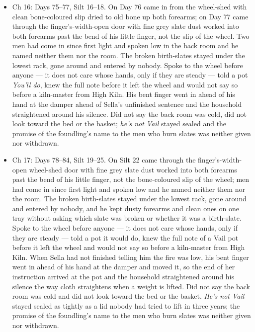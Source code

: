 \documentclass{design/chronicle}
\begin{document}
{\begin{itemize}[leftmargin=1.4em,itemsep=1pt,topsep=3pt,parsep=0pt]
\end{itemize}

\begin{itemize}[leftmargin=1.4em,itemsep=1pt,topsep=3pt,parsep=0pt]

\item Ch 16: Days 75–77, Silt 16–18. On Day 76 came in from the wheel-shed with clean bone-coloured slip dried to old bone up both forearms; on Day 77 came through the finger’s-width-open door with fine grey slate dust worked into both forearms past the bend of his little finger, not the slip of the wheel. Two men had come in since first light and spoken low in the back room and he named neither them nor the room. The broken birth-slates stayed under the lowest rack, gone around and entered by nobody. Spoke to the wheel before anyone --- it does not care whose hands, only if they are steady --- told a pot \emph{You’ll do}, knew the full note before it left the wheel and would not say so before a kiln-master from High Kiln. His bent finger went in ahead of his hand at the damper ahead of Sella’s unfinished sentence and the household straightened around his silence. Did not say the back room was cold, did not look toward the bed or the basket; \emph{he’s not Vail} stayed sealed and the promise of the foundling’s name to the men who burn slates was neither given nor withdrawn.

\end{itemize}

\begin{itemize}[leftmargin=1.4em,itemsep=1pt,topsep=3pt,parsep=0pt]

\item Ch 17: Days 78–84, Silt 19–25. On Silt 22 came through the finger’s-width-open wheel-shed door with fine grey slate dust worked into both forearms past the bend of his little finger, not the bone-coloured slip of the wheel; men had come in since first light and spoken low and he named neither them nor the room. The broken birth-slates stayed under the lowest rack, gone around and entered by nobody, and he kept dusty forearms and clean ones on one tray without asking which slate was broken or whether it was a birth-slate. Spoke to the wheel before anyone — it does not care whose hands, only if they are steady — told a pot it would do, knew the full note of a Vail pot before it left the wheel and would not say so before a kiln-master from High Kiln. When Sella had not finished telling him the fire was low, his bent finger went in ahead of his hand at the damper and moved it, so the end of her instruction arrived at the pot and the household straightened around his silence the way cloth straightens when a weight is lifted. Did not say the back room was cold and did not look toward the bed or the basket. \emph{He’s not Vail} stayed sealed as tightly as a lid nobody had tried to lift in three years; the promise of the foundling’s name to the men who burn slates was neither given nor withdrawn.


\end{itemize}}
\end{document}
